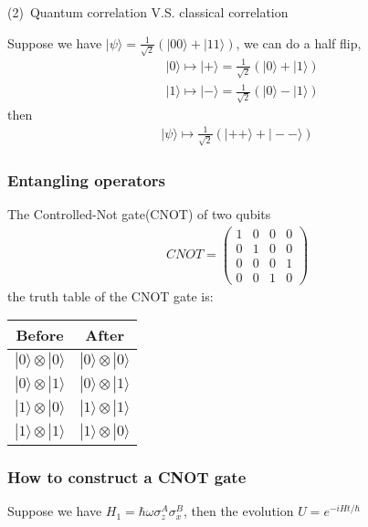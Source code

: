 \documentclass[UTF8,12pt]{article} %
\begin{document}
(2)~Quantum correlation V.S. classical correlation\\\par
Suppose we have $|\psi\rangle = \frac{1}{\sqrt{2}}\left(|00\rangle + |11\rangle\right)$, we can do a half flip,
\begin{align*}
& |0\rangle\longmapsto|+\rangle = \frac{1}{\sqrt{2}}(|0\rangle+|1\rangle)\\
& |1\rangle\longmapsto|-\rangle = \frac{1}{\sqrt{2}}(|0\rangle-|1\rangle)
\end{align*}
then
\begin{align*}
|\psi\rangle\longmapsto \frac{1}{\sqrt{2}}\left(|++\rangle + |--\rangle\right)
\end{align*}

\subsubsection{Entangling operators}
The Controlled-Not gate(CNOT) of two qubits
\begin{align}
CNOT = \begin{pmatrix}1&0&0&0\\0&1&0&0\\0&0&0&1\\0&0&1&0\end{pmatrix}
\end{align}
the truth table of the CNOT gate is:
\begin{table}[H]\centering
\begin{tabular}{|c|c|}\hline
Before&After\\ \hline
$|0\rangle\otimes|0\rangle$ & $|0\rangle\otimes|0\rangle$\\ \hline
$|0\rangle\otimes|1\rangle$ & $|0\rangle\otimes|1\rangle$\\ \hline
$|1\rangle\otimes|0\rangle$ & $|1\rangle\otimes|1\rangle$\\ \hline
$|1\rangle\otimes|1\rangle$ & $|1\rangle\otimes|0\rangle$\\ \hline
\end{tabular}
\end{table}

\subsubsection{How to construct a CNOT gate}
Suppose we have $H_1 =\hbar\omega\sigma_z^A\sigma_x^B$, then the evolution $U = e^{-iHt/\hbar}$
\end{document}
